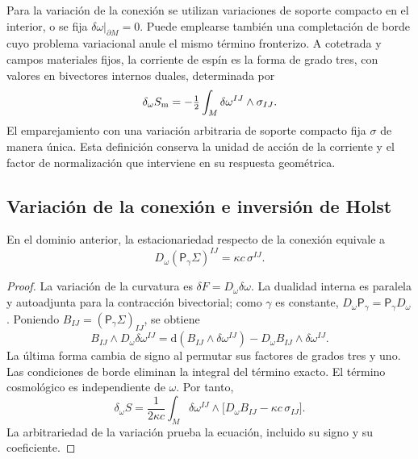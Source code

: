 Para la variación de la conexión se utilizan variaciones de soporte
compacto en el interior, o se fija
\(\delta\omega|_{\partial M}=0\). Puede emplearse también una
completación de borde cuyo problema variacional anule el mismo término
fronterizo. A cotetrada y campos materiales fijos, la corriente de espín
es la forma de grado tres, con valores en bivectores internos duales,
determinada por
\begin{equation}
 \delta_\omega S_{\rm m}
 =-\tfrac12\int_M\delta\omega^{IJ}\wedge\sigma_{IJ}.
 \label{vii:vii:eq:corriente-variacional}
\end{equation}
El emparejamiento con una variación arbitraria de soporte compacto fija
\(\sigma\) de manera única. Esta definición conserva la unidad de
acción de la corriente y el factor de normalización que interviene en
su respuesta geométrica.

\subsection{Variación de la conexión e inversión de Holst}
\label{vii:vii:subsec:variacion-holst}

\begin{theorem}
\label{vii:vii:thm:ecuacion-cartan-holst}
En el dominio anterior, la estacionariedad respecto de la conexión
equivale a
\begin{equation}
 D_\omega(\mathsf P_\gamma\Sigma)^{IJ}
       =\kappa c\,\sigma^{IJ}.
 \label{vii:vii:eq:ecuacion-cartan-holst}
\end{equation}
\end{theorem}
\begin{proof}
La variación de la curvatura es
\(\delta F=D_\omega\delta\omega\). La dualidad interna es paralela
y autoadjunta para la contracción bivectorial; como \(\gamma\) es
constante, \(D_\omega\mathsf P_\gamma=\mathsf P_\gamma D_\omega\).
Poniendo \(B_{IJ}=(\mathsf P_\gamma\Sigma)_{IJ}\), se obtiene
\[
 B_{IJ}\wedge D_\omega\delta\omega^{IJ}
 =\mathrm d(B_{IJ}\wedge\delta\omega^{IJ})
   -D_\omega B_{IJ}\wedge\delta\omega^{IJ}.
\]
La última forma cambia de signo al permutar sus factores de grados tres
y uno. Las condiciones de borde eliminan la integral del término
exacto. El término cosmológico es independiente de \(\omega\).
Por tanto,
\[
 \delta_\omega S=
 \frac1{2\kappa c}\int_M\delta\omega^{IJ}\wedge
       \bigl[D_\omega B_{IJ}-\kappa c\,\sigma_{IJ}\bigr].
\]
La arbitrariedad de la variación prueba la ecuación, incluido su signo
y su coeficiente.
\end{proof}

